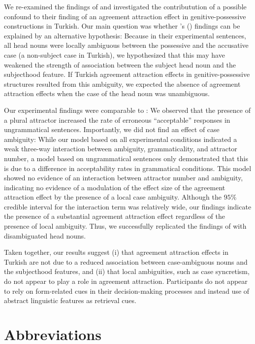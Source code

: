 \documentclass[]{interact}\usepackage[]{graphicx}\usepackage[]{color}
\theoremstyle{plain}%
\theoremstyle{definition}
\theoremstyle{remark}
\begin{document}
We re-examined the findings of \citet{LagoEtAl:2019} and investigated the contributution of a possible confound to their finding of an agreement attraction effect in genitive-possessive constructions in Turkish. Our main question was whether \citeauthor{LagoEtAl:2019}'s (\citeyear{LagoEtAl:2019}) findings can be explained by an alternative hypothesis: 
Because in their experimental sentences, all head nouns were locally ambiguous between the possessive and the accusative case (a non-subject case in Turkish), we hypothesized that this may have weakened the strength of association between the subject head noun and the subjecthood feature.
If Turkish agreement attraction effects in genitive-possessive structures resulted from this ambiguity, we expected the absence of agreement attraction effects when the case of the head noun was unambiguous.  

Our experimental findings were comparable to \citet{LagoEtAl:2019}: We observed that the presence of a plural attractor increased the rate of erroneous ``acceptable'' responses  
in ungrammatical sentences.
Importantly, we did not find an effect of case ambiguity: While our model based on all experimental conditions indicated a weak three-way interaction between ambiguity, grammaticality, and attractor number, a model based on ungrammatical sentences only demonstrated that this is due to a difference in acceptability rates in grammatical conditions. This model showed no evidence of an interaction between attractor number and ambiguity, indicating no evidence of a modulation of the effect size of the agreement attraction effect by the presence of a local case ambiguity. 
Although the $95\%$ credible interval for the interaction term was relatively wide, our findings indicate the presence of a substantial agreement attraction effect regardless of the presence of local ambiguity.
Thus, we successfully replicated the findings of \citet{LagoEtAl:2019} with disambiguated head nouns. 

Taken together, our results suggest (i) that agreement attraction effects in Turkish are not due to a reduced association between case-ambiguous nouns and the subjecthood features, and (ii) that local ambiguities, such as case syncretism, do not appear to play a role in agreement attraction. Participants do not appear to rely on form-related cues in their decision-making processes and instead use of abstract linguistic features as retrieval cues.

\section*{Abbreviations} %
\end{document}
